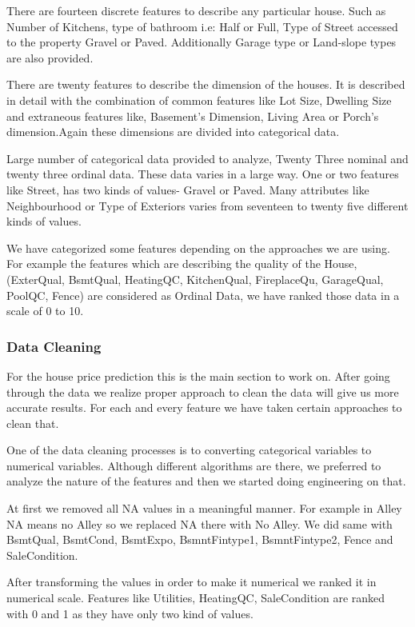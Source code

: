 \documentclass[fleqn,10pt]{SelfArx} %
\begin{document}
There are fourteen discrete features to describe any particular house. Such as Number of Kitchens, type of bathroom i.e: Half or Full, Type of Street accessed to the property Gravel or Paved. Additionally Garage type or Land-slope types are also provided. 

There are twenty features to describe the dimension of the houses. It is  described in detail with the combination of common features like Lot Size, Dwelling Size and extraneous features like, Basement's Dimension, Living Area or Porch's dimension.Again these dimensions are divided into categorical data.

Large number of categorical data provided to analyze, Twenty Three nominal and twenty three ordinal data. These data varies in a large way. One or two features like Street, has two kinds of values- Gravel or Paved. Many attributes like Neighbourhood or Type of Exteriors varies from seventeen to twenty five different kinds of values.

We have categorized some features depending on the approaches we are using. For example the features which are describing the quality of the House, (ExterQual, BsmtQual, HeatingQC, KitchenQual, FireplaceQu, GarageQual, PoolQC, Fence) are considered as Ordinal Data, we have ranked those data in a scale of 0 to 10.  


\subsubsection{Data Cleaning}

For the house price prediction this is the main section to work on. After going through the data we realize proper approach to clean the data will give us more accurate results.  For each and every feature we have taken certain approaches to clean that. 

One of the data cleaning processes is to converting categorical variables to numerical variables. Although different algorithms are there, we preferred to analyze the nature of the features and then we started doing engineering on that.

At first we removed all NA values in a meaningful manner.
For example in Alley NA means no Alley so we replaced NA there with No Alley.
We did same with BsmtQual, BsmtCond, BsmtExpo, BsmntFintype1, BsmntFintype2, Fence and SaleCondition.

After transforming the values in order to make it numerical we ranked it in numerical scale. Features like Utilities, HeatingQC, SaleCondition are ranked with 0 and 1 as they have only two kind of values.
\end{document}
